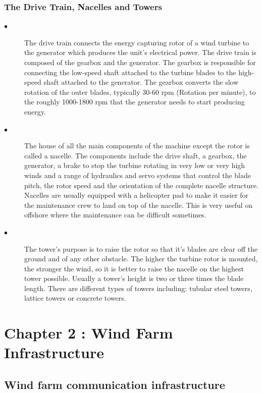 \documentclass[twosided,a4,10pt]{article}
\begin{document}
\begin{multicols}{2}
\subsubsection{The Drive Train, Nacelles and Towers}
\begin{description}
\item[$\bullet$] 
The drive train connects the energy capturing rotor of a wind turbine to the generator which produces the unit's electrical power. The drive train is composed of the gearbox and the generator. The gearbox is responsible for connecting the low-speed shaft attached to the turbine blades to the high-speed shaft attached to the generator. The gearbox converts the slow rotation of the outer blades, typically 30-60 rpm (Rotation per minute), to the roughly 1000-1800 rpm that the generator needs to start producing energy.
\item[$\bullet$] 
The house of all the main components of the machine except the rotor is called a nacelle. The components include the drive shaft, a gearbox, the generator, a brake to stop the turbine rotating in very low or very high winds and a range of hydraulics and servo systems that control the blade pitch, the rotor speed and the orientation of the complete nacelle structure. Nacelles are usually equipped with a helicopter pad to make it easier for the maintenance crew to land on top of the nacelle. This is very useful on offshore where the maintenance can be difficult sometimes. 
\item[$\bullet$] 
The tower's purpose is to raise the rotor so that it's blades are clear off the ground and of any other obstacle. The higher the turbine rotor is mounted, the stronger the wind, so it is better to raise the nacelle on the highest tower possible. Usually a tower's height is two or three times the blade length. There are different types of towers including: tubular steel towers, lattice towers or concrete towers.

\end{description}

\section{Chapter 2 : Wind Farm Infrastructure }
 \subsection{Wind farm communication infrastructure}

\end{multicols}
\end{document}
